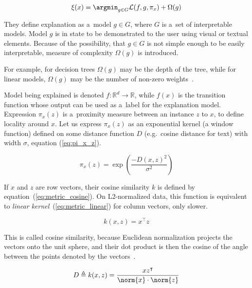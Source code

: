 \begin{equation} \label{eq:lime}
    \xi(x) = \argmin_{g \in G} \mathcal{L}(f, g, \pi_x) + \Omega(g)
\end{equation}

They define explanation as a~model \( g \in G \), where \( G \) is a~set of interpretable models.
Model \( g \) is in state to be demonstrated to the user using visual or textual elements.
Because of the possibility, that \( g \in G \) is not simple enough to be easily interpretable, measure of complexity \( \Omega(g) \) is introduced.

\begin{displayquote}
    For example, for decision trees \( \Omega(g) \) may be the depth of the tree, while for linear models, \( \Omega(g) \) may be the number of non-zero weights~\cite{lime}.
\end{displayquote}

Model being explained is denoted \( f: \mathbb{R}^d \to \mathbb{R} \), while \( f(x) \) is the transition function whose output can be used as a~label for the explanation model.
Expression \( \pi_x(z) \) is a~proximity measure between an instance \( z \) to \( x \), to define locality around \( x \).
Let us express \( \pi_x(z) \) as an exponential kernel (a window function) defined on some distance function \( D \) (e.g.\ cosine distance for text) with width \( \sigma \), equation (\ref{eq:pi_x_z}).

\begin{equation}\label{eq:pi_x_z}
    \pi_x(z) = \exp \left( \dfrac{-D(x, z)^2}{\sigma^2} \right)
\end{equation}

If \( x \) and \( z \) are row vectors, their cosine similarity \( k \) is defined by equation~(\ref{eq:metric_cosine}).
On L2-normalized data, this function is equivalent to \textit{linear kernel}~(\ref{eq:metric_linear}) for column vectors, only slower.

\begin{equation}\label{eq:metric_linear}
    k(x, z) = x^\intercal z
\end{equation}

This is called cosine similarity, because Euclidean normalization projects the vectors onto the unit sphere, and their dot product is then the cosine of the angle between the points denoted by the vectors~\cite{scikit-learn}.

\begin{equation}\label{eq:metric_cosine}
    D \triangleq k(x, z) = \dfrac{x z^\intercal}{\norm{x} \cdot \norm{z}}
\end{equation}

